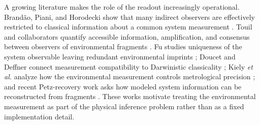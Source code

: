 A growing literature makes the role of the readout increasingly operational.  Brand\~ao, Piani, and Horodecki show that many indirect observers are effectively restricted to classical information about a common system measurement \cite{brandao2015}.  Touil and collaborators quantify accessible information, amplification, and consensus between observers of environmental fragments \cite{touil2022,girolami2022,touil2025}.  Fu studies uniqueness of the system observable leaving redundant environmental imprints \cite{fu2021}; Doucet and Deffner connect measurement compatibility to Darwinistic classicality \cite{doucet2025}; Kiely \emph{et al.} analyze how the environmental measurement controls metrological precision \cite{kiely2026}; and recent Petz-recovery work asks how modeled system information can be reconstructed from fragments \cite{torvinen2026}.  These works motivate treating the environmental measurement as part of the physical inference problem rather than as a fixed implementation detail.

